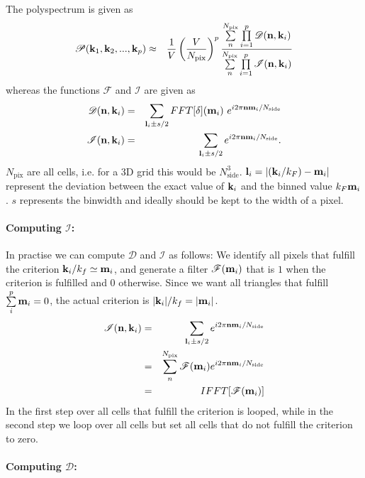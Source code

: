 \documentclass[twoside,10pt]{article}
\begin{document}
\begin{multicols}{2}
The polyspectrum is given as
\begin{eqnarray}
 \mathscr{P}({\bf k}_1, {\bf k}_2, ..., {\bf k}_p) &\approx& \frac{1}{V} \left(\frac{V}{N_\mathrm{pix}}\right)^{p}  \frac{\sum\limits_{n}^{N_\mathrm{pix}} \prod\limits_{i=1}^p \mathscr{D}({\bf n}, {\bf k}_i)}{\sum\limits_{n}^{N_\mathrm{pix}} \prod\limits_{i=1}^p \mathscr{I}({\bf n}, {\bf k}_i)}
\end{eqnarray}
whereas the functions $\mathscr{F}$ and $\mathscr{I}$ are given as
\begin{eqnarray}
 \mathscr{D} ({\bf n}, {\bf k}_i) &=& \sum\limits_{{\bf l}_i\pm s/2} FFT[\delta]({\bf m}_i)\ e^{i 2 \pi {\bf n} {\bf m}_i / N_\mathrm{side}}\\
 \mathscr{I} ({\bf n}, {\bf k}_i) &=& \sum\limits_{{\bf l}_i\pm s/2} e^{i 2 \pi {\bf n} {\bf m}_i / N_\mathrm{side}}.
\end{eqnarray}
$N_\mathrm{pix}$ are all cells, i.e. for a 3D grid this would be $N_\mathrm{side}^3$.
${\bf l}_i = |({\bf k}_i/k_F)-{\bf m}_i|$ represent the deviation between the exact value of ${\bf k}_i$ and the binned value $k_F {\bf m}_i$. $s$ represents the binwidth and ideally should be kept to the width of a pixel.

\paragraph{Computing $\mathscr{I}$:}

In practise we can compute $\mathscr{D}$ and $\mathscr{I}$ as follows: We identify all pixels that fulfill the criterion ${\bf k}_i/k_f \simeq {\bf m}_i$, and generate a filter $\mathscr{F}({\bf m}_i)$ that is $1$ when the criterion is fulfilled and $0$ otherwise. Since we want all triangles that fulfill $\sum\limits_i^p {\bf m}_i=0$, the actual criterion is $|{\bf k}_i|/k_f = |{\bf m}_i|$.
\begin{eqnarray}
 \mathscr{I} ({\bf n}, {\bf k}_i) &=& \sum\limits_{{\bf l}_i\pm s/2} e^{i 2 \pi {\bf n} {\bf m}_i / N_\mathrm{side}} \nonumber \\
 &=& \sum\limits_{n}^{N_\mathrm{pix}} \mathscr{F}({\bf m}_i) e^{i 2 \pi {\bf n} {\bf m}_i / N_\mathrm{side}} \nonumber \\
 &=& IFFT[\mathscr{F}({\bf m}_i)]
\end{eqnarray}
In the first step over all cells that fulfill the criterion is looped, while in the second step we loop over all cells but set all cells that do not fulfill the criterion to zero.

\paragraph{Computing $\mathscr{D}$:}


\end{multicols}
\end{document}
